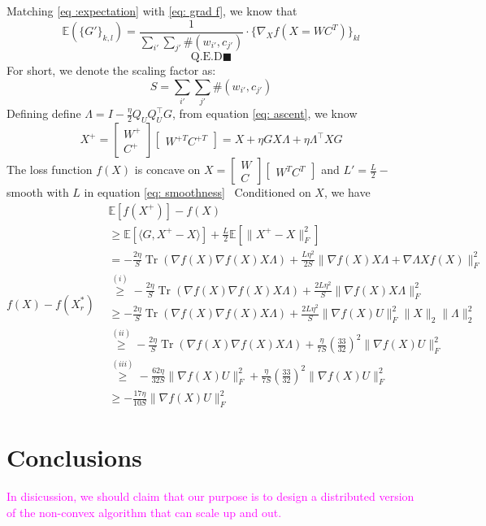 \documentclass[letterpaper]{article} %
\DeclareMathOperator{\Tr}{Tr} %
\begin{document}
Matching \ref{eq :expectation} with \ref{eq: grad f}, we know that
\begin{equation}
\mathbb{E}(\{G'\}_{k,l})=\frac{1}{\sum_{i'}\sum_{j'} \#(w_{i'}, c_{j'})}\cdot \{\nabla_X f(X=WC^T)\}_{kl} \label{eq: scaling}
\end{equation} 
\[
\text{Q.E.D}\blacksquare
\]
For short, we denote the scaling factor as:
\begin{equation}
S={\sum_{i'}\sum_{j'} \#(w_{i'}, c_{j'})}
\end{equation}
Defining define $\Lambda=I-\frac{\eta}{2}Q_UQ_U^\top G$, from equation \ref{eq: ascent}, we know
\begin{equation}
X^+=\begin{bmatrix}W^+\\C^+\end{bmatrix}\begin{bmatrix}W^{+T}C^{+T}\end{bmatrix}=X+\eta GX\Lambda+\eta\Lambda^\top XG
\end{equation}
The loss function $f(X)$ is concave on $X=\begin{bmatrix}W\\C\end{bmatrix}\begin{bmatrix}W^{T} C^{T}\end{bmatrix}$ and $L'=\frac{L}{2}-$ smooth with $L$ in equation \ref{eq: smoothness}
\
Conditioned on $X$, we have
\begin{equation}
f(X)-f(X_r^*)\begin{split}
&\mathbb{E}[f(X^+)]-f(X)\\&\ge \mathbb{E}[\langle G, X^+-X \rangle]+\frac{L}{2}\mathbb{E}[\|X^+-X\|_F^2] \\
&=-\frac{2\eta}{S}\Tr(\nabla f(X)\nabla f(X)X\Lambda)+\frac{L\eta^2}{2S}\|\nabla f(X)X\Lambda+\nabla \Lambda Xf(X)\|^2_F\\
&\overset{(i)}{\ge}-\frac{2\eta}{S}\Tr(\nabla f(X)\nabla f(X)X\Lambda)+\frac{2L\eta^2}{S}\|\nabla f(X)X\Lambda\|^2_F\\
&\ge-\frac{2\eta}{S}\Tr(\nabla f(X)\nabla f(X)X\Lambda)+\frac{2L\eta^2}{S}\|\nabla f(X)U\|^2_F\|X\|_2\|\Lambda\|^2_2\\
&\overset{(ii)}{\ge}-\frac{2\eta}{S}\Tr(\nabla f(X)\nabla f(X)X\Lambda)+\frac{\eta}{7S}(\frac{33}{32})^2\|\nabla f(X)U\|^2_F\\
&\overset{(iii)}{\ge}-\frac{62\eta}{32S}\|\nabla f(X)U\|^2_F+\frac{\eta}{7S}(\frac{33}{32})^2\|\nabla f(X)U\|^2_F\\
&\ge-\frac{17\eta}{10S}\|\nabla f(X)U\|^2_F
\end{split}
\end{equation}
\section{Conclusions}
\textcolor{magenta}{In disicussion, we should claim that our purpose is to design a distributed version of the non-convex algorithm that can scale up and out.}
 


\end{document}
